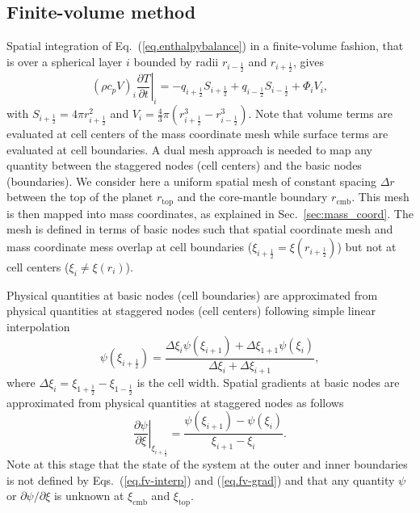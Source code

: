\documentclass{article}
\begin{document}
\subsection{Finite-volume method}
Spatial integration of Eq.~(\ref{eq.enthalpybalance}) in a finite-volume fashion, that is over a spherical layer $i$ bounded by radii $r_{i-\frac{1}{2}}$ and $r_{i+\frac{1}{2}}$, gives
\begin{equation}
    (\rho c_p V)_i \left.\frac{\partial T}{\partial t}\right|_{i} = -q_{i+\frac{1}{2}} S_{i+\frac{1}{2}} + q_{i-\frac{1}{2}} S_{i-\frac{1}{2}} + \Phi_i V_i,
    \label{eq.fvm-balance}
\end{equation}
with $S_{i+\frac{1}{2}}=4\pi r^2_{i+\frac{1}{2}}$ and $V_i=\frac{4}{3}\pi (r_{i+\frac{1}{2}}^3-r_{i-\frac{1}{2}}^3)$. Note that volume terms are evaluated at cell centers of the mass coordinate mesh while surface terms are evaluated at cell boundaries.  A dual mesh approach is needed to map any quantity between the staggered nodes (cell centers) and the basic nodes (boundaries). We consider here a uniform spatial mesh of constant spacing $\Delta r$ between the top of the planet $r_\mathrm{top}$ and the core-mantle boundary $r_\mathrm{cmb}$. This mesh is then mapped into mass coordinates, as explained in Sec.~\ref{sec:mass_coord}. The mesh is defined in terms of basic nodes such that spatial coordinate mesh and mass coordinate mess overlap at cell boundaries ($\xi_{i+\frac{1}{2}}=\xi(r_{i+\frac{1}{2}})$) but not at cell centers ($\xi_i \neq \xi(r_i)$).

Physical quantities at basic nodes (cell boundaries) are approximated from physical quantities at staggered nodes (cell centers) following simple linear interpolation
\begin{equation}
    \psi(\xi_{i+\frac{1}{2}}) =  \frac{\Delta \xi_i\psi(\xi_{i+1})+\Delta\xi_{1+1}\psi(\xi_i)}{\Delta \xi_i+\Delta\xi_{i+1}},
    \label{eq.fv-interp}
\end{equation}
where $\Delta \xi_i=\xi_{1+\frac{1}{2}}-\xi_{1-\frac{1}{2}}$ is the cell width. Spatial gradients at basic nodes are approximated from physical quantities at staggered nodes as follows
\begin{equation}
    \left.\frac{\partial \psi}{\partial \xi}\right|_{\xi_{i+\frac{1}{2}}} = \frac{\psi(\xi_{i+1})-\psi(\xi_i)}{\xi_{i+1}-\xi_i}.
    \label{eq.fv-grad}
\end{equation}
Note at this stage that the state of the system at the outer and inner boundaries is not defined by Eqs.~(\ref{eq.fv-interp}) and (\ref{eq.fv-grad}) and that any quantity $\psi$ or $\partial\psi/\partial \xi$ is unknown at $\xi_\mathrm{cmb}$ and $\xi_\mathrm{top}$.
\end{document}
